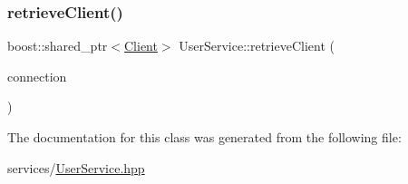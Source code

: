 \mbox{\label{classUserService_a2f79f2e036977fd16ae7ca14b1017530}} 
\subsubsection{\texorpdfstring{retrieve\+Client()}{retrieveClient()}}
{\footnotesize\ttfamily boost\+::shared\+\_\+ptr$<$\mbox{\hyperlink{classClient}{Client}}$>$ User\+Service\+::retrieve\+Client (\begin{DoxyParamCaption}\item[{boost\+::shared\+\_\+ptr$<$ \mbox{\hyperlink{classIConnection}{I\+Connection}} $>$ \&}]{connection }\end{DoxyParamCaption})\hspace{0.3cm}{\ttfamily [inline]}}



The documentation for this class was generated from the following file\+:\begin{DoxyCompactItemize}
\item 
services/\mbox{\hyperlink{UserService_8hpp}{User\+Service.\+hpp}}\end{DoxyCompactItemize}
